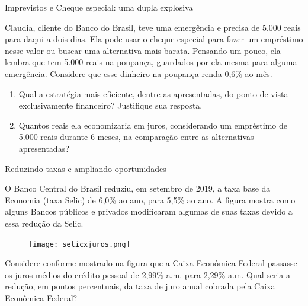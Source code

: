 \label{fin-prac-6}

\begin{task}{Imprevistos e Cheque especial: uma dupla explosiva}
\label{fin-ativ-25}

Claudia, cliente do Banco do Brasil, teve uma emergência e precisa de 5.000 reais para daqui a dois dias. Ela pode usar o cheque especial para fazer um empréstimo nesse valor ou buscar uma alternativa mais barata. Pensando um pouco, ela lembra que tem 5.000 reais na poupança, guardados por ela mesma para alguma emergência. Considere que esse dinheiro na poupança renda 0,6\% ao mês. 

\begin{enumerate}
\item Qual a estratégia mais eficiente, dentre as apresentadas, do ponto de vista exclusivamente financeiro? Justifique sua resposta. 
\item Quantos reais ela economizaria em juros, considerando um empréstimo de 5.000 reais durante 6 meses, na comparação entre as alternativas apresentadas?
\end{enumerate}
\end{task}

\begin{task}{Reduzindo taxas e ampliando oportunidades}
\label{fin-ativ-26}

O Banco Central do Brasil reduziu, em setembro de 2019, a taxa base da Economia (taxa Selic) de 6,0\% ao ano, para 5,5\% ao ano. A figura mostra como alguns Bancos públicos e privados modificaram algumas de suas taxas devido a essa redução da Selic. 

\begin{figure}[H]
\centering
\texttt{[image: selicxjuros.png]}

\end{figure}

Considere conforme mostrado na figura que a Caixa Econômica Federal passasse os juros médios do crédito pessoal de 2,99\% a.m. para 2,29\% a.m. Qual seria a redução, em pontos percentuais, da taxa de juro anual cobrada pela Caixa Econômica Federal?
\end{task}


